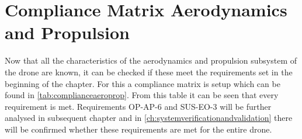 \section{Compliance Matrix Aerodynamics and Propulsion}
\label{sec:propcompliancematrix}

Now that all the characteristics of the aerodynamics and propulsion subsystem of the drone are known, it can be checked if these meet the requirements set in the beginning of the chapter. For this a compliance matrix is setup which can be found in \autoref{tab:complianceaeroprop}. From this table it can be seen that every requirement is met. Requirements OP-AP-6 and SUS-EO-3 will be further analysed in subsequent chapter and in \autoref{ch:systemverificationandvalidation} there will be confirmed whether these requirements are met for the entire drone. 

